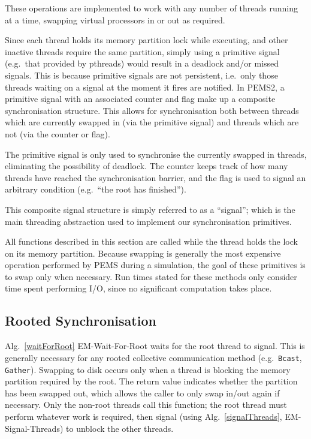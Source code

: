 \documentclass[12pt]{carletoncsthesis}
\begin{document}
These operations are implemented to work with any number of threads running
at a time, swapping virtual processors in or out as required.

Since each thread holds its memory partition lock while executing, and other
inactive threads require the same partition, simply using a primitive signal
(e.g.\ that provided by pthreads) would result in a deadlock and/or missed
signals.  This is because primitive signals are not persistent, i.e.\ only
those threads waiting on a signal at the moment it fires are notified.
In PEMS2, a primitive signal with an associated counter and flag make up a
composite synchronisation structure.  This allows for synchronisation both
between threads which are currently swapped in (via the primitive signal)
and threads which are not (via the counter or flag).

The primitive signal is only used to synchronise the  currently swapped in
threads, eliminating the possibility of deadlock.  The counter keeps track
of how many threads have reached the synchronisation barrier, and the flag
is used to signal an arbitrary condition (e.g.\ ``the root has finished'').

This composite signal structure is simply referred to as a ``signal''; which
is the main threading abstraction used to implement our synchronisation
primitives.

All functions described in this section are called while the thread holds
the lock on its memory partition.  Because swapping is generally the most
expensive operation performed by PEMS during a simulation, the goal of these
primitives is to swap only when necessary.  Run times stated for these methods
only consider time spent performing I/O, since no significant computation
takes place.

\clearpage
\subsection{Rooted Synchronisation}


Alg.~\ref{waitForRoot} {\sc EM-Wait-For-Root} waits for the root thread to
signal.  This is generally necessary for any rooted collective communication
method (e.g.\ {\tt Bcast}, {\tt Gather}).  Swapping to disk occurs only when
a thread is blocking the memory partition required by the root.  The return
value indicates whether the partition has been swapped out, which allows the
caller to only swap in/out again if necessary.  Only the non-root threads
call this function; the root thread must perform whatever work is required,
then signal (using Alg.~\ref{signalThreads}, {\sc EM-Signal-Threads}) to
unblock the other threads.
\end{document}
